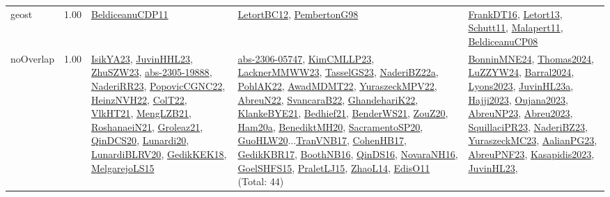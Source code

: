{\begin{longtable}{p{3cm}r>{\raggedright\arraybackslash}p{6cm}>{\raggedright\arraybackslash}p{6cm}>{\raggedright\arraybackslash}p{8cm}}
\index{geost}\index{Constraints!geost}geost &  1.00 & \hyperref[detail:BeldiceanuCDP11]{BeldiceanuCDP11} & \hyperref[detail:LetortBC12]{LetortBC12}, \hyperref[detail:PembertonG98]{PembertonG98} & \hyperref[detail:FrankDT16]{FrankDT16}, \hyperref[detail:Letort13]{Letort13}, \hyperref[detail:Schutt11]{Schutt11}, \hyperref[detail:Malapert11]{Malapert11}, \hyperref[detail:BeldiceanuCP08]{BeldiceanuCP08}\\
\index{noOverlap}\index{Constraints!noOverlap}noOverlap &  1.00 & \hyperref[detail:IsikYA23]{IsikYA23}, \hyperref[detail:JuvinHHL23]{JuvinHHL23}, \hyperref[detail:ZhuSZW23]{ZhuSZW23}, \hyperref[detail:abs-2305-19888]{abs-2305-19888}, \hyperref[detail:NaderiRR23]{NaderiRR23}, \hyperref[detail:PopovicCGNC22]{PopovicCGNC22}, \hyperref[detail:HeinzNVH22]{HeinzNVH22}, \hyperref[detail:ColT22]{ColT22}, \hyperref[detail:VlkHT21]{VlkHT21}, \hyperref[detail:MengLZB21]{MengLZB21}, \hyperref[detail:RoshanaeiN21]{RoshanaeiN21}, \hyperref[detail:Groleaz21]{Groleaz21}, \hyperref[detail:QinDCS20]{QinDCS20}, \hyperref[detail:Lunardi20]{Lunardi20}, \hyperref[detail:LunardiBLRV20]{LunardiBLRV20}, \hyperref[detail:GedikKEK18]{GedikKEK18}, \hyperref[detail:MelgarejoLS15]{MelgarejoLS15} & \hyperref[detail:abs-2306-05747]{abs-2306-05747}, \hyperref[detail:KimCMLLP23]{KimCMLLP23}, \hyperref[detail:LacknerMMWW23]{LacknerMMWW23}, \hyperref[detail:TasselGS23]{TasselGS23}, \hyperref[detail:NaderiBZ22a]{NaderiBZ22a}, \hyperref[detail:PohlAK22]{PohlAK22}, \hyperref[detail:AwadMDMT22]{AwadMDMT22}, \hyperref[detail:YuraszeckMPV22]{YuraszeckMPV22}, \hyperref[detail:AbreuN22]{AbreuN22}, \hyperref[detail:SvancaraB22]{SvancaraB22}, \hyperref[detail:GhandehariK22]{GhandehariK22}, \hyperref[detail:KlankeBYE21]{KlankeBYE21}, \hyperref[detail:Bedhief21]{Bedhief21}, \hyperref[detail:BenderWS21]{BenderWS21}, \hyperref[detail:ZouZ20]{ZouZ20}, \hyperref[detail:Ham20a]{Ham20a}, \hyperref[detail:BenediktMH20]{BenediktMH20}, \hyperref[detail:SacramentoSP20]{SacramentoSP20}, \hyperref[detail:GuoHLW20]{GuoHLW20}...\hyperref[detail:TranVNB17]{TranVNB17}, \hyperref[detail:CohenHB17]{CohenHB17}, \hyperref[detail:GedikKBR17]{GedikKBR17}, \hyperref[detail:BoothNB16]{BoothNB16}, \hyperref[detail:QinDS16]{QinDS16}, \hyperref[detail:NovaraNH16]{NovaraNH16}, \hyperref[detail:GoelSHFS15]{GoelSHFS15}, \hyperref[detail:PraletLJ15]{PraletLJ15}, \hyperref[detail:ZhaoL14]{ZhaoL14}, \hyperref[detail:EdisO11]{EdisO11} (Total: 44) & \hyperref[detail:BonninMNE24]{BonninMNE24}, \hyperref[detail:Thomas2024]{Thomas2024}, \hyperref[detail:LuZZYW24]{LuZZYW24}, \hyperref[detail:Barral2024]{Barral2024}, \hyperref[detail:Lyons2023]{Lyons2023}, \hyperref[detail:JuvinHL23a]{JuvinHL23a}, \hyperref[detail:Hajji2023]{Hajji2023}, \hyperref[detail:Oujana2023]{Oujana2023}, \hyperref[detail:AbreuNP23]{AbreuNP23}, \hyperref[detail:Abreu2023]{Abreu2023}, \hyperref[detail:SquillaciPR23]{SquillaciPR23}, \hyperref[detail:NaderiBZ23]{NaderiBZ23}, \hyperref[detail:YuraszeckMC23]{YuraszeckMC23}, \hyperref[detail:AalianPG23]{AalianPG23}, \hyperref[detail:AbreuPNF23]{AbreuPNF23}, \hyperref[detail:Kasapidis2023]{Kasapidis2023}, \hyperref[detail:JuvinHL23]{JuvinHL23}, 
\end{longtable}}

